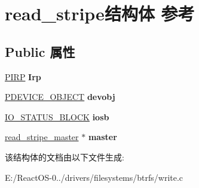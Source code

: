 \hypertarget{structread__stripe}{}\section{read\+\_\+stripe结构体 参考}
\label{structread__stripe}
\subsection*{Public 属性}
\begin{DoxyCompactItemize}
\item 
\mbox{\label{structread__stripe_a10bf33ce6126feaae3854e1759ecd3cf}} 
\hyperlink{interfacevoid}{P\+I\+RP} {\bfseries Irp}
\item 
\mbox{\label{structread__stripe_aaab030b0ee5de5dabf8bac14b09dd634}} 
\hyperlink{struct___d_e_v_i_c_e___o_b_j_e_c_t}{P\+D\+E\+V\+I\+C\+E\+\_\+\+O\+B\+J\+E\+CT} {\bfseries devobj}
\item 
\mbox{\label{structread__stripe_abba3ab98a63edd6264c08ca58b037547}} 
\hyperlink{struct___i_o___s_t_a_t_u_s___b_l_o_c_k}{I\+O\+\_\+\+S\+T\+A\+T\+U\+S\+\_\+\+B\+L\+O\+CK} {\bfseries iosb}
\item 
\mbox{\label{structread__stripe_a72692d78e643ced837c4e2c0413f9625}} 
\hyperlink{structread__stripe__master}{read\+\_\+stripe\+\_\+master} $\ast$ {\bfseries master}
\end{DoxyCompactItemize}


该结构体的文档由以下文件生成\+:\begin{DoxyCompactItemize}
\item 
E\+:/\+React\+O\+S-\/0../drivers/filesystems/btrfs/write.\+c\end{DoxyCompactItemize}
